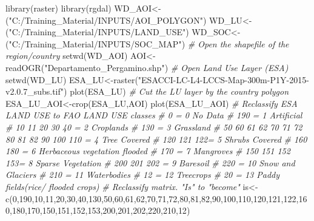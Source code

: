 \documentclass[
  10pt,
  b5paper,
]{book}
\newenvironment{Shaded}{\begin{snugshade}}{\end{snugshade}}
\newcommand{\CommentTok}[1]{\textcolor[rgb]{0.56,0.35,0.01}{\textit{#1}}}
\newcommand{\DecValTok}[1]{\textcolor[rgb]{0.00,0.00,0.81}{#1}}
\newcommand{\FunctionTok}[1]{\textcolor[rgb]{0.00,0.00,0.00}{#1}}
\newcommand{\NormalTok}[1]{#1}
\newcommand{\OtherTok}[1]{\textcolor[rgb]{0.56,0.35,0.01}{#1}}
\newcommand{\StringTok}[1]{\textcolor[rgb]{0.31,0.60,0.02}{#1}}
\begin{document}
\begin{Shaded}
\begin{Highlighting}[]
\FunctionTok{library}\NormalTok{(raster)}
\FunctionTok{library}\NormalTok{(rgdal)}
\NormalTok{WD\_AOI}\OtherTok{\textless{}{-}}\NormalTok{(}\StringTok{"C:/Training\_Material/INPUTS/AOI\_POLYGON"}\NormalTok{)}
\NormalTok{WD\_LU}\OtherTok{\textless{}{-}}\NormalTok{(}\StringTok{"C:/Training\_Material/INPUTS/LAND\_USE"}\NormalTok{)}
\NormalTok{WD\_SOC}\OtherTok{\textless{}{-}}\NormalTok{(}\StringTok{"C:/Training\_Material/INPUTS/SOC\_MAP"}\NormalTok{)}
\CommentTok{\# Open the shapefile of the region/country}
\FunctionTok{setwd}\NormalTok{(WD\_AOI)}
\NormalTok{AOI}\OtherTok{\textless{}{-}}\FunctionTok{readOGR}\NormalTok{(}\StringTok{"Departamento\_Pergamino.shp"}\NormalTok{)}
\CommentTok{\# Open Land Use Layer (ESA)}
\FunctionTok{setwd}\NormalTok{(WD\_LU)}
\NormalTok{ESA\_LU}\OtherTok{\textless{}{-}}\FunctionTok{raster}\NormalTok{(}\StringTok{"ESACCI{-}LC{-}L4{-}LCCS{-}Map{-}300m{-}P1Y{-}2015{-}v2.0.7\_subs.tif"}\NormalTok{)}
\FunctionTok{plot}\NormalTok{(ESA\_LU)}
\CommentTok{\# Cut the LU layer by the country polygon}
\NormalTok{ESA\_LU\_AOI}\OtherTok{\textless{}{-}}\FunctionTok{crop}\NormalTok{(ESA\_LU,AOI)}
\FunctionTok{plot}\NormalTok{(ESA\_LU\_AOI)}
\CommentTok{\# Reclassify ESA LAND USE to FAO LAND USE classes}
\CommentTok{\#     0 = 0   No Data}
\CommentTok{\#   190 = 1 Artificial}
\CommentTok{\#   10 11 20 30 40 = 2 Croplands}
\CommentTok{\#   130 = 3 Grassland}
\CommentTok{\#   50 60 61 62 70 71 72 80 81 82 90 100 110 = 4 Tree Covered}
\CommentTok{\#   120 121 122= 5 Shrubs Covered}
\CommentTok{\#   160 180 = 6 Herbaceous vegetation flooded}
\CommentTok{\#   170 = 7 Mangroves}
\CommentTok{\#   150 151 152 153= 8 Sparse Vegetation}
\CommentTok{\#   200 201 202 = 9 Baresoil}
\CommentTok{\#   220 = 10 Snow and Glaciers}
\CommentTok{\#   210 = 11 Waterbodies}
\CommentTok{\#   12 = 12 Treecrops}
\CommentTok{\#   20 = 13 Paddy fields(rice/ flooded crops)}
\CommentTok{\# Reclassify matrix. "Is" to "become"}
\NormalTok{is}\OtherTok{\textless{}{-}}\FunctionTok{c}\NormalTok{(}\DecValTok{0}\NormalTok{,}\DecValTok{190}\NormalTok{,}\DecValTok{10}\NormalTok{,}\DecValTok{11}\NormalTok{,}\DecValTok{20}\NormalTok{,}\DecValTok{30}\NormalTok{,}\DecValTok{40}\NormalTok{,}\DecValTok{130}\NormalTok{,}\DecValTok{50}\NormalTok{,}\DecValTok{60}\NormalTok{,}\DecValTok{61}\NormalTok{,}\DecValTok{62}\NormalTok{,}\DecValTok{70}\NormalTok{,}\DecValTok{71}\NormalTok{,}\DecValTok{72}\NormalTok{,}\DecValTok{80}\NormalTok{,}\DecValTok{81}\NormalTok{,}\DecValTok{82}\NormalTok{,}\DecValTok{90}\NormalTok{,}\DecValTok{100}\NormalTok{,}\DecValTok{110}\NormalTok{,}\DecValTok{120}\NormalTok{,}\DecValTok{121}\NormalTok{,}\DecValTok{122}\NormalTok{,}\DecValTok{160}\NormalTok{,}\DecValTok{180}\NormalTok{,}\DecValTok{170}\NormalTok{,}\DecValTok{150}\NormalTok{,}\DecValTok{151}\NormalTok{,}\DecValTok{152}\NormalTok{,}\DecValTok{153}\NormalTok{,}\DecValTok{200}\NormalTok{,}\DecValTok{201}\NormalTok{,}\DecValTok{202}\NormalTok{,}\DecValTok{220}\NormalTok{,}\DecValTok{210}\NormalTok{,}\DecValTok{12}\NormalTok{)}

\end{Highlighting}
\end{Shaded}
\end{document}

